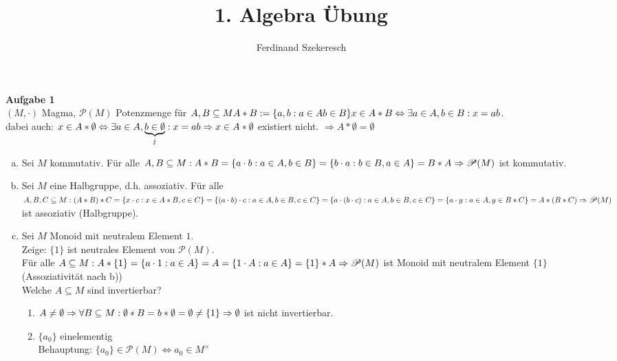 \documentclass{article}
\title{1. Algebra Übung}
\author{Ferdinand Szekeresch}
\begin{document}
\maketitle
\textbf{Aufgabe 1}\\
$(M,\cdot )$ Magma, $\mathscr{P}(M)$ Potenzmenge für $A,B\subseteq M A*B := \{a,b : a\in A b\in B\} \\
x\in A*B \Leftrightarrow \exists a\in A,b\in B: x = ab$.\\
dabei auch: $x\in A*\emptyset \Leftrightarrow\exists a\in A,\underbrace{b\in\emptyset}_\lightning : x=ab\\
\Rightarrow x\in A*\emptyset$ existiert nicht. $\Rightarrow A*\emptyset = \emptyset$
\begin{enumerate}[a)]
\item Sei $M$ kommutativ. Für alle $A,B\subseteq M : A*B = \{a\cdot b : a\in A, b\in B\} = \{b\cdot a: b\in B, a\in A\} = B*A \\
\Rightarrow \mathscr{P}(M)$ ist kommutativ.
\item Sei $M$ eine Halbgruppe, d.h. assoziativ. Für alle $A,B, C \subseteq M: \\
(A*B)*C = \{x\cdot c : x\in A*B, c\in C\} = \{(a\cdot b)\cdot c : a\in A, b\in B, c\in C\} = \{a\cdot(b\cdot c) : a\in A, b\in B, c\in C\}\\
=\{a\cdot y : a\in A, y\in B*C\} = A*(B*C)\\
\Rightarrow \mathscr{P}(M)$ ist assoziativ (Halbgruppe).\\
\item Sei $M$ Monoid mit neutralem Element $1$.\\
Zeige: $\{1\}$ ist neutrales Element von $\mathscr{P}(M)$.\\
Für alle $A\subseteq M : A*\{1\} = \{a\cdot 1 : a\in A\} = A = \{1\cdot A : a\in A\} = \{1\}*A\\
\Rightarrow \mathscr{P}(M)$ ist Monoid mit neutralem Element $\{1\}$ (Assoziativität nach b))\\
Welche $A\subseteq M$ sind invertierbar?\\
\begin{enumerate}[1.{Fall}]
\item $A\neq\emptyset \\
\Rightarrow \forall B\subseteq M : \emptyset*B = b*\emptyset = \emptyset\neq \{1\}\\
\Rightarrow\emptyset$ ist nicht invertierbar.
\item $\{a_0\}$ einelementig\\
Behauptung: $\{a_0\} \in \mathscr{P}(M) \Leftrightarrow a_0 \in M^\times$

\end{enumerate}
\end{enumerate}
\end{document}
